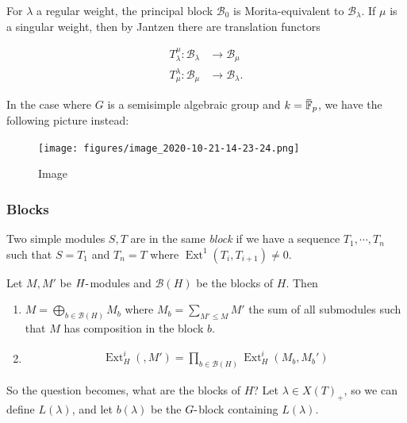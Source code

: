 For \(\lambda\) a regular weight, the principal block \(\mathcal{B}_0\)
is Morita-equivalent to \(\mathcal{B}_\lambda\). If \(\mu\) is a
singular weight, then by Jantzen there are translation functors

\begin{align*}  
T_\lambda^\mu: \mathcal{B}_\lambda &\to \mathcal{B}_\mu \\
T_\mu^\lambda: \mathcal{B}_\mu &\to \mathcal{B}_\lambda
.\end{align*}

In the case where \(G\) is a semisimple algebraic group and
\(k = \mkern 1.5mu\overline{\mkern-1.5mu{\mathbb{F}}\mkern-1.5mu}\mkern 1.5mu_p\),
we have the following picture instead:

\begin{figure}
\centering
\texttt{[image: figures/image\_2020-10-21-14-23-24.png]}
\caption{Image}
\end{figure}

\hypertarget{blocks}{%
\subsubsection{Blocks}\label{blocks}}

Two simple modules \(S, T\) are in the same \emph{block} if we have a
sequence \(T_1, \cdots, T_n\) such that \(S=T_1\) and \(T_n = T\) where
\(\operatorname{Ext}^1(T_i, T_{i+1}) \neq 0\).

\begin{lemma}[?]

Let \(M, M'\) be \(H{\hbox{-}}\)modules and \(\mathcal{B}(H)\) be the
blocks of \(H\). Then

\begin{enumerate}
\def\labelenumi{\arabic{enumi}.}
\item
  \(M = \bigoplus_{b\in \mathcal{B}(H)} M_b\) where
  \(M_b = \sum_{M'\leq M} M'\) the sum of all submodules such that \(M\)
  has composition in the block \(b\).
\item

  \begin{align*} \operatorname{Ext}_H^i(, M') = \prod_{b\in\mathcal{B}(H)} \operatorname{Ext}_H^i (M_b, M_b') \end{align*}
\end{enumerate}

\end{lemma}

So the question becomes, what are the blocks of \(H\)? Let
\(\lambda \in X(T)_+\), so we can define \(L(\lambda)\), and let
\(b(\lambda)\) be the \(G{\hbox{-}}\)block containing \(L(\lambda)\).

